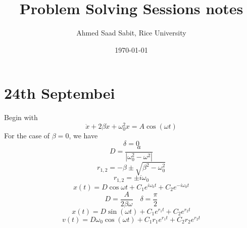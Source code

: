\documentclass[twocolumn,letter]{article}
\title{Problem Solving Sessions notes}
\author{Ahmed Saad Sabit, Rice University}
\date{\today}
\begin{document}
\maketitle


\section{24th Septembei} 
Begin with \[
\ddot{x} + 2 \beta \dot{ x} + \omega_0^2 x = A \cos (\omega t)
\]
For the case of $\beta=0$, we have 
\[
\delta = 0 
\] 
\[
D = \frac{a}{| \omega_0^2 - \omega^2| }
\] 
\[
	r_{1,2} = - \beta \pm \sqrt{\beta^2 - \omega_0^2} 
\] 
\[
	r _{1,2} = \pm i \omega_0
\] 	
\[
x(t) = D \cos \omega t + C_1 e ^{ i \omega_0 t} + C_2 e^{- i \omega_0 t}
\]
\[
D = \frac{A}{2 \beta \omega } \quad \delta = \frac{\pi}{2}
\] 
\[
 x(t) = D \sin (\omega t)  + C_1 e^{r_1 t} + C_2 e^{r_2 t}
\]
\[
v(t) = D \omega_0 \cos( \omega t)  + C_1r_1 e^{ r_1 t} + C_2 r_2 e^{r_2 t}
\] 
\end{document}
